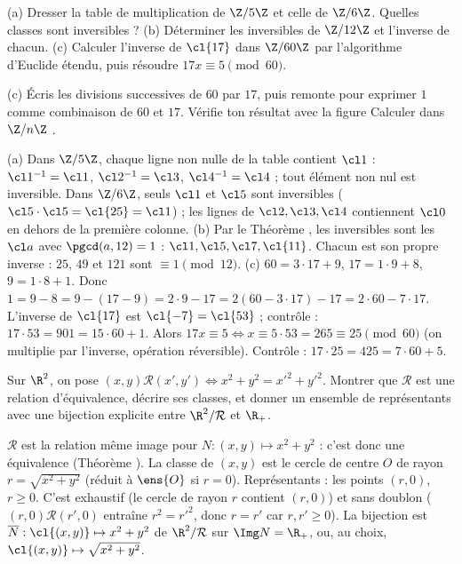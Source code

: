 \begin{exo}\label{exo-zn}
(a) Dresser la table de multiplication de $\Z/5\Z$ et celle de $\Z/6\Z$. Quelles classes sont inversibles ?
(b) Déterminer les inversibles de $\Z/12\Z$ et l'inverse de chacun.
(c) Calculer l'inverse de $\cl{17}$ dans $\Z/60\Z$ par l'algorithme d'Euclide étendu, puis résoudre $17x\equiv5\pmod{60}$.
\begin{indication}
(c) Écris les divisions successives de $60$ par $17$, puis remonte pour exprimer $1$ comme combinaison de $60$ et $17$. Vérifie ton résultat avec la figure \og Calculer dans $\Z/n\Z$ \fg.
\end{indication}
\begin{corrige}
(a) Dans $\Z/5\Z$, chaque ligne non nulle de la table contient $\cl1$ : $\cl1^{-1}=\cl1$, $\cl2^{-1}=\cl3$, $\cl4^{-1}=\cl4$ ; tout élément non nul est inversible. Dans $\Z/6\Z$, seuls $\cl1$ et $\cl5$ sont inversibles ($\cl5\cdot\cl5=\cl{25}=\cl1$) ; les lignes de $\cl2,\cl3,\cl4$ contiennent $\cl0$ en dehors de la première colonne.
(b) Par le Théorème , les inversibles sont les $\cl a$ avec $\pgcd(a,12)=1$ : $\cl1,\cl5,\cl7,\cl{11}$. Chacun est son propre inverse : $25$, $49$ et $121$ sont $\equiv1\pmod{12}$.
(c) $60=3\cdot17+9$, $17=1\cdot9+8$, $9=1\cdot8+1$. Donc $1=9-8=9-(17-9)=2\cdot9-17=2(60-3\cdot17)-17=2\cdot60-7\cdot17$. L'inverse de $\cl{17}$ est $\cl{-7}=\cl{53}$ ; contrôle : $17\cdot53=901=15\cdot60+1$. Alors $17x\equiv5\iff x\equiv 5\cdot53=265\equiv25\pmod{60}$ (on multiplie par l'inverse, opération réversible). Contrôle : $17\cdot25=425=7\cdot60+5$.
\end{corrige}
\end{exo}
\begin{exo}
Sur $\R^2$, on pose $(x,y)\mathcal R(x',y')\iff x^2+y^2=x'^2+y'^2$. Montrer que $\mathcal R$ est une relation d'équivalence, décrire ses classes, et donner un ensemble de représentants avec une bijection explicite entre $\R^2/\mathcal R$ et $\R_+$.
\begin{corrige}
$\mathcal R$ est la relation \og même image \fg{} pour $N:(x,y)\mapsto x^2+y^2$ : c'est donc une équivalence (Théorème ). La classe de $(x,y)$ est le cercle de centre $O$ de rayon $r=\sqrt{x^2+y^2}$ (réduit à $\ens{O}$ si $r=0$). Représentants : les points $(r,0)$, $r\ge0$. C'est exhaustif (le cercle de rayon $r$ contient $(r,0)$) et sans doublon ($(r,0)\mathcal R(r',0)$ entraîne $r^2=r'^2$, donc $r=r'$ car $r,r'\ge0$). La bijection est $\overline N:\cl{(x,y)}\mapsto x^2+y^2$ de $\R^2/\mathcal R$ sur $\Img N=\R_+$, ou, au choix, $\cl{(x,y)}\mapsto\sqrt{x^2+y^2}$.
\end{corrige}
\end{exo}


